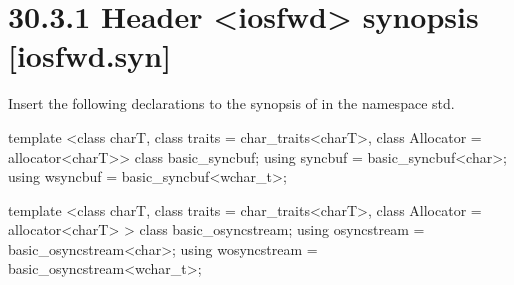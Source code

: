 \documentclass[ebook,11pt,article]{memoir}
\begin{document}
\section{30.3.1 Header <iosfwd> synopsis [iosfwd.syn]}

Insert the following declarations to the synopsis of  in the namespace std.

\begin{addedblock}
\begin{codeblock}
template <class charT,
          class traits = char_traits<charT>,
          class Allocator = allocator<charT>>
  class basic_syncbuf;
using syncbuf  = basic_syncbuf<char>;
using wsyncbuf = basic_syncbuf<wchar_t>;

template <class charT,
          class traits = char_traits<charT>,
          class Allocator = allocator<charT> >
  class basic_osyncstream;
using osyncstream = basic_osyncstream<char>;
using wosyncstream = basic_osyncstream<wchar_t>; 
\end{codeblock}
\end{addedblock}
\end{document}
